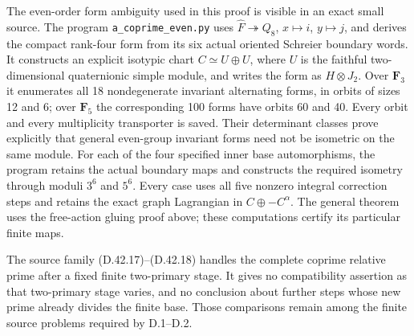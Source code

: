 The even-order form ambiguity used in this proof is
visible in an exact small source.
The program \texttt{a\_coprime\_even.py} uses
\(\widehat F\twoheadrightarrow Q_8\), \(x\mapsto i\),
\(y\mapsto j\), and derives the compact rank-four
form from its six actual oriented Schreier boundary
words.
It constructs an explicit isotypic chart
\(C\simeq U\oplus U\), where \(U\) is the faithful
two-dimensional quaternionic simple module, and
writes the form as \(H\otimes J_2\).
Over \(\mathbf F_3\) it enumerates all 18
nondegenerate invariant alternating forms, in
orbits of sizes 12 and 6; over \(\mathbf F_5\)
the corresponding 100 forms have orbits 60 and 40.
Every orbit and every multiplicity transporter is
saved.
Their determinant classes prove explicitly that
general even-group invariant forms need not be
isometric on the same module.
For each of the four specified inner base
automorphisms, the program retains the actual
boundary maps and constructs the required
isometry through moduli \(3^6\) and \(5^6\).
Every case uses all five nonzero integral
correction steps and retains the exact graph
Lagrangian in \(C\oplus-C^\alpha\).
The general theorem uses the free-action gluing
proof above; these computations certify its
particular finite maps.

The source family \textup{(D.42.17)--(D.42.18)}
handles the complete coprime relative prime
after a fixed finite two-primary stage.
It gives no compatibility assertion as that
two-primary stage varies, and no conclusion
about further steps whose new prime already
divides the finite base.
Those comparisons remain among the finite
source problems required by D.1--D.2.
